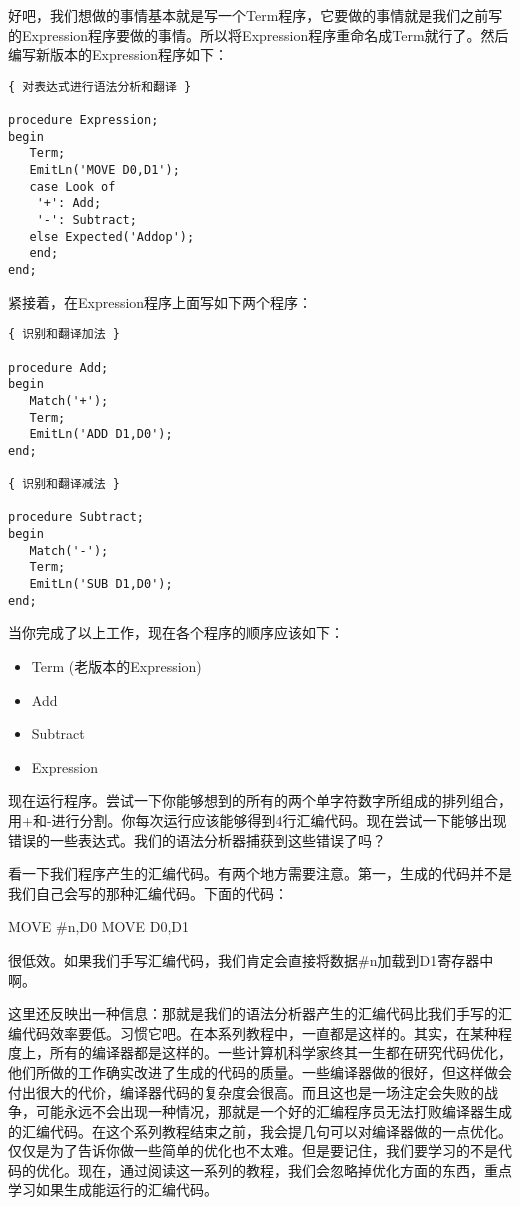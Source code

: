 好吧，我们想做的事情基本就是写一个Term程序，它要做的事情就是我们之前写的Expression程序要做的事情。所以将Expression程序重命名成Term就行了。然后编写新版本的Expression程序如下：

\begin{verbatim}
{ 对表达式进行语法分析和翻译 }

procedure Expression;
begin
   Term;
   EmitLn('MOVE D0,D1');
   case Look of
    '+': Add;
    '-': Subtract;
   else Expected('Addop');
   end;
end;
\end{verbatim}

紧接着，在Expression程序上面写如下两个程序：

\begin{verbatim}
{ 识别和翻译加法 }

procedure Add;
begin
   Match('+');
   Term;
   EmitLn('ADD D1,D0');
end;

{ 识别和翻译减法 }

procedure Subtract;
begin
   Match('-');
   Term;
   EmitLn('SUB D1,D0');
end;
\end{verbatim}

当你完成了以上工作，现在各个程序的顺序应该如下：

\begin{itemize}
   \item Term (老版本的Expression)
   \item Add
   \item Subtract
   \item Expression
\end{itemize}

现在运行程序。尝试一下你能够想到的所有的两个单字符数字所组成的排列组合，用+和-进行分割。你每次运行应该能够得到4行汇编代码。现在尝试一下能够出现错误的一些表达式。我们的语法分析器捕获到这些错误了吗？

看一下我们程序产生的汇编代码。有两个地方需要注意。第一，生成的代码并不是我们自己会写的那种汇编代码。下面的代码：

\begin{tcolorbox}
MOVE \#n,D0
MOVE D0,D1
\end{tcolorbox}

很低效。如果我们手写汇编代码，我们肯定会直接将数据\#n加载到D1寄存器中啊。

这里还反映出一种信息：那就是我们的语法分析器产生的汇编代码比我们手写的汇编代码效率要低。习惯它吧。在本系列教程中，一直都是这样的。其实，在某种程度上，所有的编译器都是这样的。一些计算机科学家终其一生都在研究代码优化，他们所做的工作确实改进了生成的代码的质量。一些编译器做的很好，但这样做会付出很大的代价，编译器代码的复杂度会很高。而且这也是一场注定会失败的战争，可能永远不会出现一种情况，那就是一个好的汇编程序员无法打败编译器生成的汇编代码。在这个系列教程结束之前，我会提几句可以对编译器做的一点优化。仅仅是为了告诉你做一些简单的优化也不太难。但是要记住，我们要学习的不是代码的优化。现在，通过阅读这一系列的教程，我们会忽略掉优化方面的东西，重点学习如果生成能运行的汇编代码。

